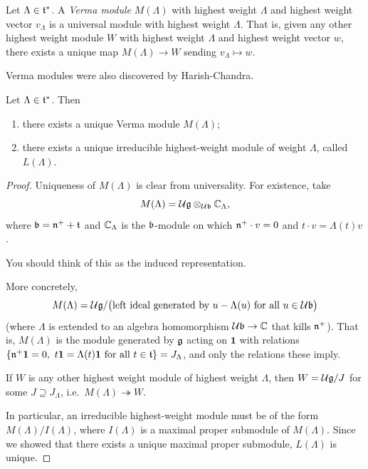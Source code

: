 \begin{definition}
Let $\Lambda \in \mathfrak{t}^*$. A \emph{Verma module} $M(\Lambda)$ with highest
weight $\Lambda$ and highest weight vector $v_\Lambda$ is a universal module
with highest weight $\Lambda$. That is, given any other highest weight module
$W$ with highest weight $\Lambda$ and highest weight vector $w$, there exists a
unique map $M(\Lambda) \to W$ sending $v_\Lambda \mapsto w$.
\end{definition}

\begin{remark}
Verma modules were also discovered by Harish-Chandra.
\end{remark}

\begin{proposition}
Let $\Lambda \in \mathfrak{t}^*$. Then
\begin{enumerate}
  \item there exists a unique Verma module $M(\Lambda)$;
  \item there exists a unique irreducible highest-weight module of weight
    $\Lambda$, called $L(\Lambda)$.
\end{enumerate}
\end{proposition}

\begin{proof}
Uniqueness of $M(\Lambda)$ is clear from universality. For existence, take
\[
  M(\Lambda) = \mathcal{U}\mathfrak{g} \otimes_{\mathcal{U}\mathfrak{b}} \mathbb{C}_\Lambda,
\]
where $\mathfrak{b} = \mathfrak{n}^+ + \mathfrak{t}$ and $\mathbb{C}_\Lambda$ is the $\mathfrak{b}$-module on which
$\mathfrak{n}^+ \cdot v = 0$ and $t \cdot v = \Lambda(t)v$.

\begin{remark}
You should think of this as the induced representation.
\end{remark}

More concretely,
\[
  M(\Lambda) = \mathcal{U}\mathfrak{g}/\bigl(\text{left ideal generated by } u - \Lambda(u) \text{ for all } u \in \mathcal{U}\mathfrak{b}\bigr)
\]
(where $\Lambda$ is extended to an algebra homomorphism $\mathcal{U}\mathfrak{b} \to \mathbb{C}$ that
kills $\mathfrak{n}^+$). That is, $M(\Lambda)$ is the module generated by $\mathfrak{g}$ acting
on $\mathbf{1}$ with relations
$\{\fn^+\mathbf{1} = 0,\ t\mathbf{1} = \Lambda(t)\mathbf{1} \text{ for all } t \in \at\} = J_\Lambda$,
and only the relations these imply.

If $W$ is any other highest weight module of highest weight $\Lambda$, then
$W = \mathcal{U}\mathfrak{g}/J$ for some $J \supseteq J_\Lambda$, i.e.\
$M(\Lambda) \twoheadrightarrow W$.

In particular, an irreducible highest-weight module must be of the form
$M(\Lambda)/I(\Lambda)$, where $I(\Lambda)$ is a maximal proper submodule of
$M(\Lambda)$. Since we showed that there exists a unique maximal proper
submodule, $L(\Lambda)$ is unique.
\end{proof}

